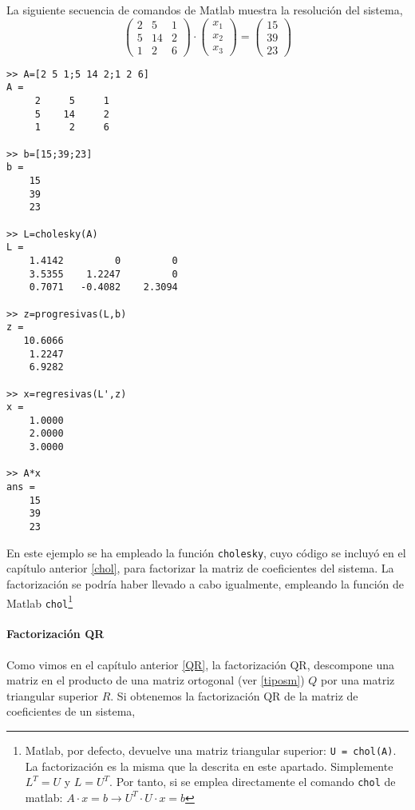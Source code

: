La siguiente secuencia de comandos de Matlab muestra la resolución del sistema,
\begin{equation*}
\begin{pmatrix}
2& 5& 1\\
5& 14& 2\\
1& 2& 6
\end{pmatrix}\cdot \begin{pmatrix}
x_1\\
x_2\\
x_3
\end{pmatrix}=\begin{pmatrix}
15\\
39\\
23
\end{pmatrix}
\end{equation*}

\begin{verbatim}
>> A=[2 5 1;5 14 2;1 2 6]
A =
     2     5     1
     5    14     2
     1     2     6

>> b=[15;39;23]
b =
    15
    39
    23

>> L=cholesky(A)
L =
    1.4142         0         0
    3.5355    1.2247         0
    0.7071   -0.4082    2.3094

>> z=progresivas(L,b)
z =
   10.6066
    1.2247
    6.9282

>> x=regresivas(L',z)
x =
    1.0000
    2.0000
    3.0000

>> A*x
ans =
    15
    39
    23
\end{verbatim}

En este ejemplo se ha empleado la función \texttt{cholesky}, cuyo código se incluyó en el capítulo anterior \ref{chol}, para factorizar la matriz de coeficientes del sistema. La factorización se podría haber llevado a cabo igualmente, empleando la función de Matlab \texttt{chol}\footnote{Matlab, por defecto, devuelve una matriz triangular superior: \texttt{U = chol(A)}. La factorización es la misma que la descrita en este apartado. Simplemente $L^T = U$ y $L = U^T$. Por tanto, si se emplea directamente el comando \texttt{chol}   de matlab: $A\cdot x = b \rightarrow U^T\cdot U\cdot x= b$}

\paragraph{Factorización QR} Como vimos en el capítulo anterior \ref{QR}, la factorización QR, descompone una matriz en el producto de una matriz ortogonal  (ver \ref{tiposm}) $Q$  por una matriz triangular superior $R$. Si obtenemos la factorización QR de la matriz de coeficientes de un sistema,

